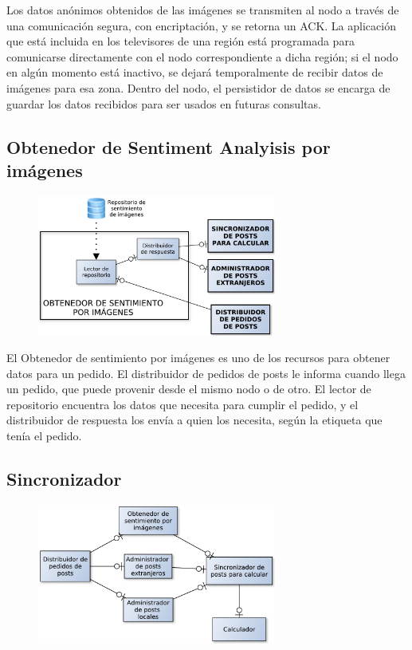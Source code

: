 Los datos anónimos obtenidos de las imágenes se transmiten al nodo a través de una comunicación segura, con encriptación, y se retorna un ACK. La aplicación que está incluida en los televisores de una región está programada para comunicarse directamente con el nodo correspondiente a dicha región; si el nodo en algún momento está inactivo, se dejará temporalmente de recibir datos de imágenes para esa zona. Dentro del nodo, el persistidor de datos se encarga de guardar los datos recibidos para ser usados en futuras consultas.

\subsection{Obtenedor de Sentiment Analyisis por imágenes}

\begin{figure}[H]
\centering
\includegraphics[width=0.7\textwidth]{graph/obtenedorimg.pdf}
\end{figure}

El Obtenedor de sentimiento por imágenes es uno de los recursos para obtener datos para un pedido. El distribuidor de pedidos de posts le informa cuando llega un pedido, que puede provenir desde el mismo nodo o de otro. El lector de repositorio encuentra los datos que necesita para cumplir el pedido, y el distribuidor de respuesta los envía a quien los necesita, según la etiqueta que tenía el pedido.

\subsection{Sincronizador}

\begin{figure}[H]
\centering
\includegraphics[width=0.7\textwidth]{graph/sincro.pdf}
\end{figure}

